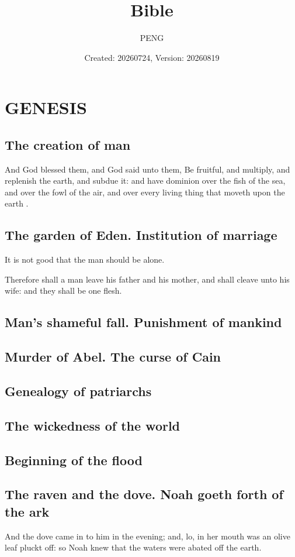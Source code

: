 \documentclass{article}
\title{Bible}
\author{PENG}
\date{Created: 20260724, Version: 20260819}
\begin{document}
\maketitle
\tableofcontents
\section{GENESIS}
\subsection{The creation of man}
And God blessed them, and God said unto them, Be fruitful, and multiply, and replenish the earth, and subdue it: and have dominion over the fish of the sea, and over the fowl of the air, and over every living thing that moveth upon the earth \cite{CARROLL_2008_THE_BIBLE_AUTHORIZED_KING_JAMES_VERSION}.

\subsection{The garden of Eden. Institution of marriage}
It is not good that the man should be alone.

Therefore shall a man leave his father and his mother, and shall cleave unto his wife: and they shall be one flesh.

\subsection{Man's shameful fall. Punishment of mankind}
\subsection{Murder of Abel. The curse of Cain}
\subsection{Genealogy of patriarchs}
\subsection{The wickedness of the world}
\subsection{Beginning of the flood}
\subsection{The raven and the dove. Noah goeth forth of the ark}
And the dove came in to him in the evening; and, lo, in her mouth was an olive leaf pluckt off: so Noah knew that the waters were abated off the earth.
\end{document}
